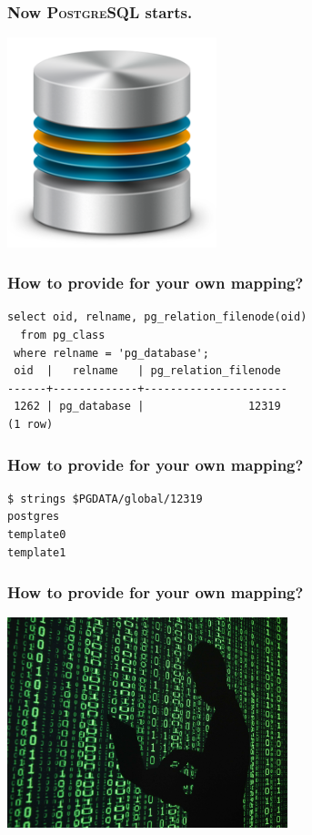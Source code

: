 \documentclass{beamer}
\begin{document}
\begin{frame}
  \frametitle{Now \textsc{PostgreSQL} starts.}

  \vfill
  
  \begin{center}
    \includegraphics[height=2.4in]{LRN-LNP-database.png}
  \end{center}
\end{frame}

\begin{frame}[fragile]
  \frametitle{How to provide for your own mapping?}

  \begin{center}
  \begin{verbatim}
select oid, relname, pg_relation_filenode(oid)
  from pg_class
 where relname = 'pg_database';
 oid  |   relname   | pg_relation_filenode 
------+-------------+----------------------
 1262 | pg_database |                12319
(1 row)
  \end{verbatim}  
  \end{center}
\end{frame}

\begin{frame}[fragile]
  \frametitle{How to provide for your own mapping?}

  \begin{verbatim}
$ strings $PGDATA/global/12319
postgres
template0
template1
  \end{verbatim}  
\end{frame}

\begin{frame}
  \frametitle{How to provide for your own mapping?}
  
  \vfill
  
  \begin{center}
    \includegraphics[height=2.4in]{Hacker-2.jpg}
  \end{center}
\end{frame}
\end{document}
